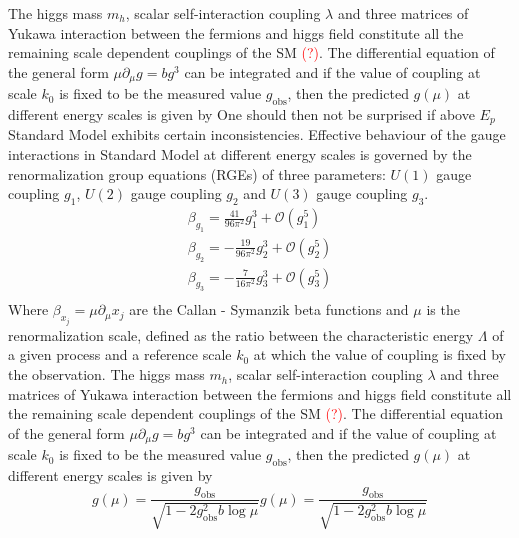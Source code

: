 \documentclass[11pt, a4paper]{article}
\begin{document}
The higgs mass $m_h$, scalar self-interaction coupling $\lambda$ and three matrices of Yukawa interaction between the fermions and higgs field constitute all the remaining scale dependent couplings of the SM \textcolor{red}{(?)}.
The differential equation of the general form $\mu \partial_\mu g = b g^3$ can be integrated and if the value of coupling at scale $k_0$ is fixed to be the measured value $g_{\text{obs}}$, then the predicted $g(\mu)$ at different energy scales is given by
One should then not be surprised if above $E_p$ Standard Model exhibits certain inconsistencies.
Effective behaviour of the gauge interactions in Standard Model at different energy scales is governed by the renormalization group equations (RGEs) of three parameters: $U(1)$ gauge coupling $g_1$, $U(2)$ gauge coupling $g_2$ and $U(3)$ gauge coupling $g_3$.
\begin{gather}
   \beta_{g_1} = \frac{41}{96\pi^2} g_1^3 + \mathcal{O}(g_1^5) \\%
    \beta_{g_2} = - \frac{19}{96\pi^2} g_2^3  + \mathcal{O}(g_2^5)\\
    \beta_{g_3} = - \frac{7}{16\pi^2} g_3^3 + \mathcal{O}(g_3^5) \\
\end{gather}
Where $\beta_{x_j} = \mu \partial_\mu x_j$ are the Callan - Symanzik beta functions and $\mu$ is the renormalization scale, defined as the ratio between the characteristic energy $\Lambda$ of a given process and a reference scale $k_0$ at which the value of coupling is fixed by the observation.
The higgs mass $m_h$, scalar self-interaction coupling $\lambda$ and three matrices of Yukawa interaction between the fermions and higgs field constitute all the remaining scale dependent couplings of the SM \textcolor{red}{(?)}.
The differential equation of the general form $\mu \partial_\mu g = b g^3$ can be integrated and if the value of coupling at scale $k_0$ is fixed to be the measured value $g_{\text{obs}}$, then the predicted $g(\mu)$ at different energy scales is given by
\begin{equation}
    g(\mu) = \frac{g_{\text{obs}}}{\sqrt{1-2g_{\text{obs}}^2 b \log{\mu}}}
    g(\mu) = \frac{g_{\text{obs}}}{\sqrt{1-2g_{\text{obs}}^2 b \log{\mu}}}
\end{equation}
\end{document}
